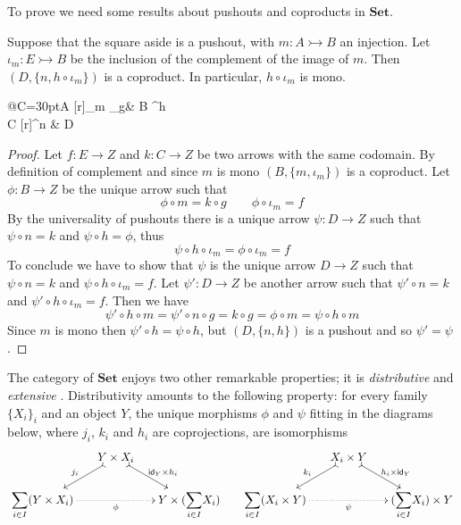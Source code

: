 \documentclass[3p]{elsarticle}
\newcommand{\Set}{\mathbf{Set}}
\newcommand{\Sum}{\mathlarger{\sum}}
\newcommand{\mto}{\rightarrowtail}
\newcommand{\id}[1]{\mathsf{id}_{#1}}
\theoremstyle{remark}
\theoremstyle{definition}
\begin{document}
To prove  we need some results about pushouts and coproducts in $\Set$.

\noindent
\begin{minipage}[l]{.85\linewidth}
\begin{lem}\label{lem:po_set}
Suppose that the square aside is a pushout, with $m\colon A\mto B$ an injection. Let $\iota_{m}\colon E\mto B$ be the inclusion of the complement of the image of $m$. Then $(D, \{n, h\circ \iota_m \})$ is a coproduct. In particular, $h\circ \iota_m$ is mono.
\end{lem}
\end{minipage}
\hfill 
\begin{minipage}[r]{.23\linewidth}
\xymatrix@R=15pt@C=30pt{A \ar@{>->}[r]_{m}  \ar[d]_{g}& B \ar[d]^{h}\\ C \ar@{>->}[r]^{n} & D}
\end{minipage}
\begin{proof}
		 Let $f\colon E\to Z$ and $k\colon C\to Z$ be two arrows with the same codomain. By definition of complement and since $m$ is mono $(B, \{m, \iota_m\})$ is a coproduct. Let $\phi\colon B\to Z$ be the unique arrow such that \[\phi\circ m=k\circ g \qquad \phi \circ \iota_m=f\] 
		By the universality of pushouts there is a unique arrow $\psi \colon D\to Z$ such that $\psi \circ n=k$ and $\psi \circ h=\phi$, thus 
		\[
		\psi \circ h\circ \iota_m =\phi \circ \iota_m=f\]	
To conclude we have to show that $\psi$ is the unique arrow $D\to Z$ such that $\psi \circ n =k$ and $\psi \circ h\circ \iota_m=f$. Let $\psi'\colon D\to Z$ be another arrow such that $\psi' \circ n=k$ and $\psi' \circ h\circ \iota_m=f$. Then we have
		\[\psi'\circ h\circ m=\psi'\circ n\circ g=k\circ g=\phi \circ m =\psi \circ h\circ m \]
	Since $m$ is mono then $\psi'\circ h=\psi \circ h$,  but $(D, \{n, h\})$ is a pushout and so $\psi'=\psi$. 
\end{proof}

The category of $\Set$ enjoys two other remarkable properties; it is \emph{distributive} and \emph{extensive} \cite{carboni1993introduction}\label{word:ext}. Distributivity amounts to the following property: for every family $\{X_i\}_{i}$ and an object $Y$, the unique morphisms $\phi$ and $\psi $ fitting in the diagrams below, where $j_i$, $k_i$ and $h_i$ are coprojections, are isomorphisms
\[\xymatrix@C=15pt@R=15pt{&Y\times X_i \ar@{>->}[dl]_{j_i} \ar@{>->}[dr]^{\id{Y}\times h_i} &&& X_i \times Y \ar@{>->}[dl]_{k_i} \ar@{>->}[dr]^{ h_i \times \id{Y}} \\ \Sum_{i\in I} (Y\times X_i) \ar@{.>}[rr]_{\phi}&& Y\times (\Sum_{i\in I}X_i) & \Sum_{i\in I}  (X_i \times Y )\ar@{.>}[rr]_{\psi}&&  (\Sum_{i\in I}X_i) \times Y }\]
\end{document}

